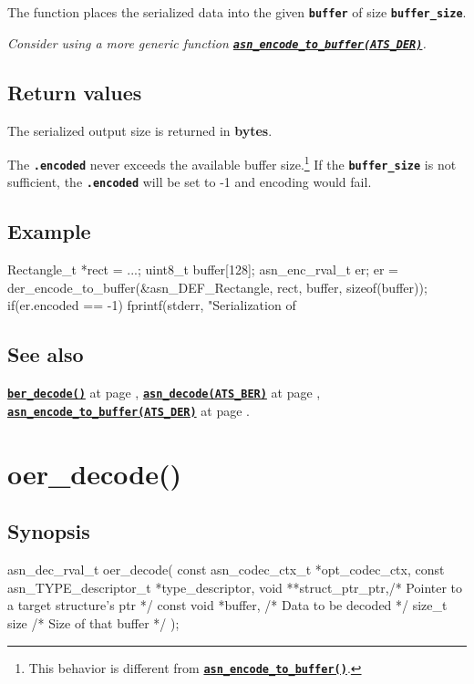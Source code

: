 \documentclass[english,oneside,12pt]{book}
\newcommand{\apisection}[2]{\clearpage\section{\label{#1}#2}}
\newcommand{\api}[2]{\hyperref[#1]{\code{#2}}}
\newcommand{\seealso}[2]{\api{#1}{#2} at page \pageref{#1}}
\newcommand{\code}[1]{\texttt{\textbf{\lstinline{#1}}}}
\begin{document}
The function places the serialized data into the given
\code{buffer} of size \code{buffer_size}.\newline

\noindent\emph{Consider using a more generic function \api{sec:asn_encode_to_buffer}{asn_encode_to_buffer(ATS_DER)}.}

\subsection*{Return values}


The serialized output size is returned in \textbf{bytes}.

The \code{.encoded} never exceeds the available buffer size.\footnote{This
behavior is different from \api{sec:asn_encode_to_buffer}{asn_encode_to_buffer()}.}
If the \code{buffer_size} is not sufficient, the \code{.encoded}
will be set to -1 and encoding would fail.

\subsection*{Example}
\begin{example}
Rectangle_t *rect = ...;
uint8_t buffer[128];
asn_enc_rval_t er;
er = der_encode_to_buffer(&asn_DEF_Rectangle, rect, buffer, sizeof(buffer));
if(er.encoded == -1) {
   fprintf(stderr, "Serialization of %
}
\end{example}

\subsection*{See also}
\seealso{sec:ber_decode}{ber_decode()},
\seealso{sec:asn_decode}{asn_decode(ATS_BER)},
\seealso{sec:asn_encode_to_buffer}{asn_encode_to_buffer(ATS_DER)}.

\apisection{sec:oer_decode}{oer\_decode()}

\subsection*{Synopsis}
\begin{signature}
asn_dec_rval_t oer_decode(
    const asn_codec_ctx_t *opt_codec_ctx,
    const asn_TYPE_descriptor_t *type_descriptor,
    void **struct_ptr_ptr,/* Pointer to a target structure's ptr */
    const void *buffer,   /* Data to be decoded */
    size_t size           /* Size of that buffer */
);
\end{signature}
\end{document}
